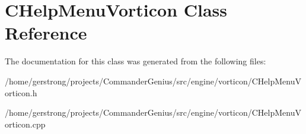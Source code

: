 \hypertarget{class_c_help_menu_vorticon}{
\section{CHelpMenuVorticon Class Reference}
\label{class_c_help_menu_vorticon}
}


The documentation for this class was generated from the following files:\begin{DoxyCompactItemize}
\item 
/home/gerstrong/projects/CommanderGenius/src/engine/vorticon/CHelpMenuVorticon.h\item 
/home/gerstrong/projects/CommanderGenius/src/engine/vorticon/CHelpMenuVorticon.cpp\end{DoxyCompactItemize}
